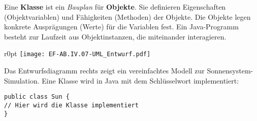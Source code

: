 \documentclass[10pt, a4paper]{arbeitsblatt}
\begin{document}
\ReiheTitel

\begin{infobox}
Eine \textbf{Klasse} ist ein \emph{Bauplan} für \textbf{Objekte}. Sie definieren Eigenschaften (Objektvariablen) und Fähigkeiten (Methoden) der Objekte. Die Objekte legen konkrete Ausprägungen (Werte) für die Variablen fest. Ein Java-Programm besteht zur Laufzeit aus Objektinstanzen, die miteinander interagieren.
\end{infobox}
\begin{wrapfix}
\begin{wrapfigure}[8]{r}{0pt}\centering
\texttt{[image: EF-AB.IV.07-UML\_Entwurf.pdf]}
\end{wrapfigure}

Das Entwurfsdiagramm rechts zeigt ein vereinfachtes Modell zur Sonnensystem-Simulation. Eine Klasse wird in Java mit dem Schlüsselwort  implementiert:
\begin{verbatim}
public class Sun {
// Hier wird die Klasse implementiert
}
\end{verbatim}
\end{wrapfix}
\end{document}
